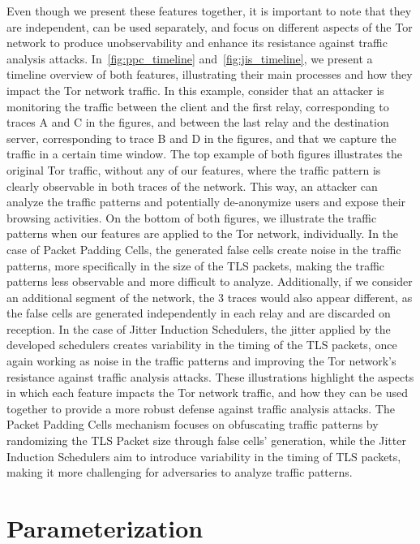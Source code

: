 Even though we present these features together, it is important to note that they are independent, can be used separately, and focus on different aspects of the Tor network to produce unobservability and enhance its resistance against traffic analysis attacks. In~\autoref{fig:ppc_timeline} and~\autoref{fig:jis_timeline}, we present a timeline overview of both features, illustrating their main processes and how they impact the Tor network traffic. In this example, consider that an attacker is monitoring the traffic between the client and the first relay, corresponding to traces A and C in the figures, and between the last relay and the destination server, corresponding to trace B and D in the figures, and that we capture the traffic in a certain time window. The top example of both figures illustrates the original Tor traffic, without any of our features, where the traffic pattern is clearly observable in both traces of the network. This way, an attacker can analyze the traffic patterns and potentially de-anonymize users and expose their browsing activities. On the bottom of both figures, we illustrate the traffic patterns when our features are applied to the Tor network, individually. In the case of Packet Padding Cells, the generated false cells create noise in the traffic patterns, more specifically in the size of the TLS packets, making the traffic patterns less observable and more difficult to analyze. Additionally, if we consider an additional segment of the network, the 3 traces would also appear different, as the false cells are generated independently in each relay and are discarded on reception. In the case of Jitter Induction Schedulers, the jitter applied by the developed schedulers creates variability in the timing of the TLS packets, once again working as noise in the traffic patterns and improving the Tor network's resistance against traffic analysis attacks.
These illustrations highlight the aspects in which each feature impacts the Tor network traffic, and how they can be used together to provide a more robust defense against traffic analysis attacks. The Packet Padding Cells mechanism focuses on obfuscating traffic patterns by randomizing the TLS Packet size through false cells' generation, while the Jitter Induction Schedulers aim
to introduce variability in the timing of TLS packets, making it more challenging for adversaries to analyze traffic patterns.

\section{Parameterization}\label{sec:parameterization}

